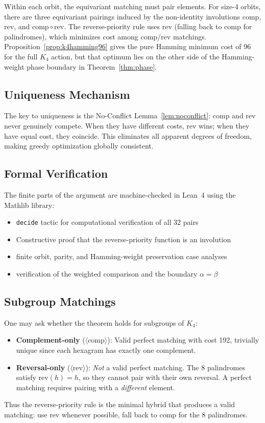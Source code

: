 \documentclass[11pt]{article}
\theoremstyle{definition}
\theoremstyle{plain}
\newcommand{\comp}{\mathrm{comp}}
\newcommand{\rev}{\mathrm{rev}}
\begin{document}
Within each orbit, the equivariant matching must pair elements. For size-4 orbits, there are three equivariant pairings induced by the non-identity involutions $\comp$, $\rev$, and $\comp \circ \rev$. The reverse-priority rule uses $\rev$ (falling back to $\comp$ for palindromes), which minimizes cost among $\comp/\rev$ matchings. Proposition~\ref{prop:k4hamming96} gives the pure Hamming minimum cost of 96 for the full $K_4$ action, but that optimum lies on the other side of the Hamming-weight phase boundary in Theorem~\ref{thm:phase}.

\subsection{Uniqueness Mechanism}

The key to uniqueness is the No-Conflict Lemma~\ref{lem:noconflict}: $\comp$ and $\rev$ never genuinely compete. When they have different costs, $\rev$ wins; when they have equal cost, they coincide. This eliminates all apparent degrees of freedom, making greedy optimization globally consistent.

\subsection{Formal Verification}

The finite parts of the argument are machine-checked in Lean~4 using the Mathlib library:
\begin{itemize}
    \item \texttt{decide} tactic for computational verification of all 32 pairs
    \item Constructive proof that the reverse-priority function is an involution
    \item finite orbit, parity, and Hamming-weight preservation case analyses
    \item verification of the weighted comparison and the boundary $\alpha=\beta$
\end{itemize}

\subsection{Subgroup Matchings}

One may ask whether the theorem holds for subgroups of $K_4$:
\begin{itemize}
    \item \textbf{Complement-only} ($\langle \comp \rangle$): Valid perfect matching with cost 192, trivially unique since each hexagram has exactly one complement.
    \item \textbf{Reversal-only} ($\langle \rev \rangle$): \emph{Not} a valid perfect matching. The 8 palindromes satisfy $\rev(h) = h$, so they cannot pair with their own reversal. A perfect matching requires pairing with a \emph{different} element.
\end{itemize}
Thus the reverse-priority rule is the minimal hybrid that produces a valid matching: use $\rev$ whenever possible, fall back to $\comp$ for the 8 palindromes.
\end{document}
